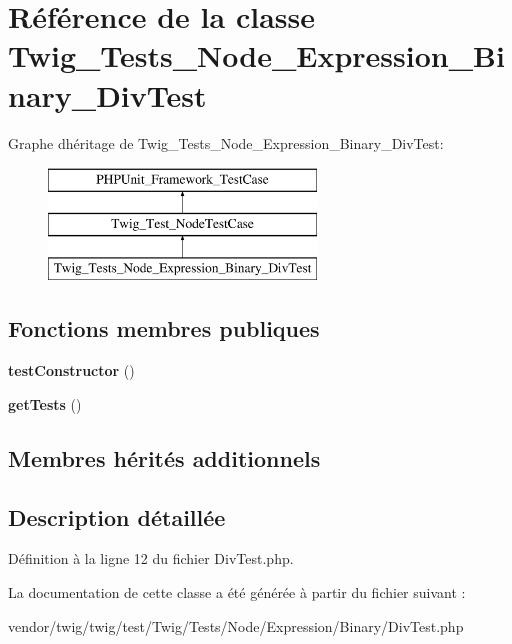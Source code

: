 \hypertarget{class_twig___tests___node___expression___binary___div_test}{}\section{Référence de la classe Twig\+\_\+\+Tests\+\_\+\+Node\+\_\+\+Expression\+\_\+\+Binary\+\_\+\+Div\+Test}
\label{class_twig___tests___node___expression___binary___div_test}
Graphe d\textquotesingle{}héritage de Twig\+\_\+\+Tests\+\_\+\+Node\+\_\+\+Expression\+\_\+\+Binary\+\_\+\+Div\+Test\+:\begin{figure}[H]
\begin{center}
\leavevmode
\includegraphics[height=3.000000cm]{class_twig___tests___node___expression___binary___div_test}
\end{center}
\end{figure}
\subsection*{Fonctions membres publiques}
\begin{DoxyCompactItemize}
\item 
{\bfseries test\+Constructor} ()\hypertarget{class_twig___tests___node___expression___binary___div_test_a47094dc941e72950570900d1418f89c6}{}\label{class_twig___tests___node___expression___binary___div_test_a47094dc941e72950570900d1418f89c6}

\item 
{\bfseries get\+Tests} ()\hypertarget{class_twig___tests___node___expression___binary___div_test_a7e247dd31cc8d37a6c97353a062a0080}{}\label{class_twig___tests___node___expression___binary___div_test_a7e247dd31cc8d37a6c97353a062a0080}

\end{DoxyCompactItemize}
\subsection*{Membres hérités additionnels}


\subsection{Description détaillée}


Définition à la ligne 12 du fichier Div\+Test.\+php.



La documentation de cette classe a été générée à partir du fichier suivant \+:\begin{DoxyCompactItemize}
\item 
vendor/twig/twig/test/\+Twig/\+Tests/\+Node/\+Expression/\+Binary/Div\+Test.\+php\end{DoxyCompactItemize}
